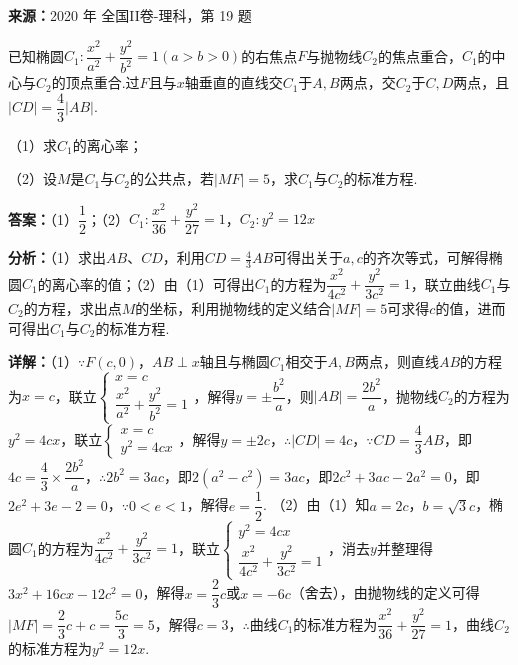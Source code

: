 \begin{question}[points=12]
\textbf{来源：}2020 年 全国II卷-理科，第 19 题\par
已知椭圆$C_1:\dfrac{x^2}{a^2}+\dfrac{y^2}{b^2}=1(a>b>0)$的右焦点$F$与抛物线$C_2$的焦点重合，$C_1$的中心与$C_2$的顶点重合.过$F$且与$x$轴垂直的直线交$C_1$于$A,B$两点，交$C_2$于$C,D$两点，且$|CD|=\dfrac43|AB|$.

（1）求$C_1$的离心率；

（2）设$M$是$C_1$与$C_2$的公共点，若$|MF|=5$，求$C_1$与$C_2$的标准方程.
\begin{solution}
\textbf{答案：}（1）$\dfrac12$；（2）$C_1:\dfrac{x^2}{36}+\dfrac{y^2}{27}=1$，$C_2:y^2=12x$

\textbf{分析：}（1）求出$AB$、$CD$，利用$CD=\frac43AB$可得出关于$a,c$的齐次等式，可解得椭圆$C_1$的离心率的值；（2）由（1）可得出$C_1$的方程为$\dfrac{x^2}{4c^2}+\dfrac{y^2}{3c^2}=1$，联立曲线$C_1$与$C_2$的方程，求出点$M$的坐标，利用抛物线的定义结合$|MF|=5$可求得$c$的值，进而可得出$C_1$与$C_2$的标准方程.

\textbf{详解：}（1）$\because F(c,0)$，$AB\perp x$轴且与椭圆$C_1$相交于$A,B$两点，则直线$AB$的方程为$x=c$，联立$\begin{cases}x=c\\\dfrac{x^2}{a^2}+\dfrac{y^2}{b^2}=1\end{cases}$，解得$y=\pm\dfrac{b^2}{a}$，则$|AB|=\dfrac{2b^2}{a}$，抛物线$C_2$的方程为$y^2=4cx$，联立$\begin{cases}x=c\\y^2=4cx\end{cases}$，解得$y=\pm2c$，$\therefore |CD|=4c$，$\because CD=\dfrac43AB$，即$4c=\dfrac43\times\dfrac{2b^2}{a}$，$\therefore 2b^2=3ac$，即$2(a^2-c^2)=3ac$，即$2c^2+3ac-2a^2=0$，即$2e^2+3e-2=0$，$\because 0<e<1$，解得$e=\dfrac12$.
（2）由（1）知$a=2c$，$b=\sqrt3c$，椭圆$C_1$的方程为$\dfrac{x^2}{4c^2}+\dfrac{y^2}{3c^2}=1$，联立$\begin{cases}y^2=4cx\\\dfrac{x^2}{4c^2}+\dfrac{y^2}{3c^2}=1\end{cases}$，消去$y$并整理得$3x^2+16cx-12c^2=0$，解得$x=\dfrac23c$或$x=-6c$（舍去），由抛物线的定义可得$|MF|=\dfrac23c+c=\dfrac{5c}{3}=5$，解得$c=3$，$\therefore$曲线$C_1$的标准方程为$\dfrac{x^2}{36}+\dfrac{y^2}{27}=1$，曲线$C_2$的标准方程为$y^2=12x$.
\end{solution}
\end{question}

